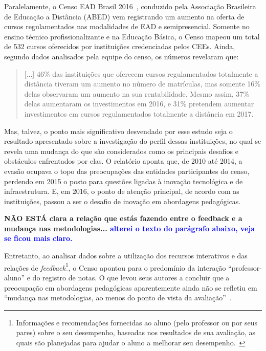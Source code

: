 Paralelamente, o Censo EAD Brasil 2016~\cite{abed2016censo}, conduzido pela Associação Brasileira de Educação a Distância (ABED) vem registrando um aumento na oferta de cursos regulamentados nas modalidades de \acrshort{EAD} e semipresencial. Somente no ensino técnico profissionalizante e na Educação Básica, o Censo mapeou um total de 532 cursos oferecidos por instituições credenciadas pelos \acrfull{CEEs}. Ainda, segundo dados analisados pela equipe do censo, os números revelaram que:

\begin{quote}
[...] 46{\%} das instituições que oferecem cursos regulamentados totalmente a distância tiveram um aumento no número de matrículas, mas somente 16{\%} delas observaram um aumento na sua rentabilidade. Mesmo assim, 37{\%} delas aumentaram os investimentos em 2016, e 31{\%} pretendem aumentar investimentos em cursos regulamentados totalmente a distância em 2017.
\end{quote}

Mas, talvez, o ponto mais significativo desvendado por esse estudo seja o resultado apresentado sobre a investigação do perfil dessas instituições, no qual se revela uma mudança do que são considerados como os principais desafios e obstáculos enfrentados por elas. O relatório aponta que, de 2010 até 2014, a evasão ocupava o topo das preocupações das entidades participantes do censo, perdendo em 2015 o posto para questões ligadas à inovação tecnológica e de infraestrutura. E, em 2016, o ponto de atenção principal, de acordo com as instituições, passou a ser o desafio de inovação em abordagens pedagógicas.

\textbf{NÃO ESTÁ clara a relação que estás fazendo entre o feedback e a mudança nas metodologias... \textcolor{blue}{alterei o texto do parágrafo abaixo, veja se ficou mais claro.}}

Entretanto, ao analisar dados sobre a utilização dos recursos interativos e das relações de \textit{feedback}\footnote{Informações e recomendações fornecidas ao aluno (pelo professor ou por seus pares) sobre o seu desempenho, baseadas nos resultados de sua avaliação, as quais são planejadas para ajudar o aluno a melhorar seu desempenho.~\cite{grego@2013}}, o Censo apontou para o predomínio da interação ``professor-aluno'' e do registro de notas. O que levou seus autores a concluir que a preocupação em abordagens pedagógicas aparentemente ainda não se refletiu em ``mudança nas metodologias, ao menos do ponto de vista da avaliação''~\cite{abed2016censo}. 

